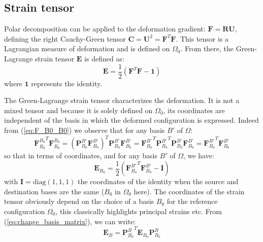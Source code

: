 \documentclass[letterpaper,12pt,oneside]{report}
\begin{document}


\subsection{Strain tensor}

Polar decomposition can be applied to the deformation gradient: $\mathbf{F} = \mathbf{RU}$, defining the right Cauchy-Green tensor $\mathbf{C} = \mathbf{U}^2 = \mathbf{F}^T\mathbf{F}$. This tensor is a Lagrangian measure of deformation and is defined on $\Omega_0$. From there, the Green-Lagrange strain tensor $\mathbf{E}$ is defined as:
\begin{equation}
\mathbf{E} = \frac{1}{2}\left(\mathbf{F}^T \mathbf{F} - \mathbf{1}\right)
\label{eq:E}
\end{equation}
where $\mathbf{1}$ represents the identity.

The Green-Lagrange strain tensor characterizes the deformation. It is not a mixed tensor and because it is solely defined on $\Omega_0$, its coordinates are independent of the basis in which the deformed configuration is expressed. Indeed from (\ref{eq:F_B0_B0}) we observe that for any basis $B'$ of $\Omega$:
\begin{equation}
{\mathbf{F}_{B_0}^{B_0}}^T \mathbf{F}_{B_0}^{B_0} = (\mathbf{P}_{B_0}^{B'} \mathbf{F}_{B_0}^{B'})^T \mathbf{P}_{B_0}^{B'} \mathbf{F}_{B_0}^{B'} = {\mathbf{F}_{B_0}^{B'}}^T {\mathbf{P}_{B_0}^{B'}}^T  \mathbf{P}_{B_0}^{B'} \mathbf{F}_{B_0}^{B'} = {\mathbf{F}_{B_0}^{B'}}^T \mathbf{F}_{B_0}^{B'}
\end{equation}
so that in terms of coordinates, and for any basis $B'$ of $\Omega$, we have:
\begin{equation}
\mathbf{E}_{B_0} = \frac{1}{2}\left({\mathbf{F}_{B_0}^{B'}}^T \mathbf{F}_{B_0}^{B'} - \mathbf{I}\right)
\label{eq:E_coordinates}
\end{equation}
with $\mathbf{I} = \mathrm{diag}(1,1,1)$ the coordinates of the identity when the source and destination bases are the same ($B_0$ in $\Omega_0$ here). The coordinates of the strain tensor obviously depend on the choice of a basis $B_0$ for the reference configuration $\Omega_0$, this classically highlights principal strains etc. From (\ref{eq:change_basis_matrix}), we can write:
\begin{equation}
\mathbf{E}_B = {\mathbf{P}_{B_0}^B}^T \mathbf{E}_{B_0} \mathbf{P}_{B_0}^B
\label{eq:E_B}
\end{equation}
\end{document}
